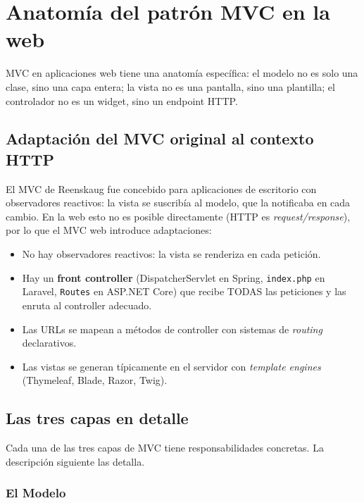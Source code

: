 \documentclass[11pt,a4paper,openany]{book}
\begin{document}
\section{Anatomía del patrón MVC en la web}

MVC en aplicaciones web tiene una anatomía específica: el
modelo no es solo una clase, sino una capa entera; la vista no es
una pantalla, sino una plantilla; el controlador no es un widget,
sino un endpoint HTTP.


\subsection{Adaptación del MVC original al contexto HTTP}

El MVC de Reenskaug fue concebido para aplicaciones de escritorio
con observadores reactivos: la vista se suscribía al modelo, que la
notificaba en cada cambio. En la web esto no es posible directamente
(HTTP es \emph{request/response}), por lo que el MVC web introduce
adaptaciones:

\begin{itemize}
\item No hay observadores reactivos: la vista se renderiza en cada
petición.
\item Hay un \textbf{front controller} (DispatcherServlet en Spring,
\texttt{index.php} en Laravel, \texttt{Routes} en ASP.NET Core) que
recibe TODAS las peticiones y las enruta al controller adecuado.
\item Las URLs se mapean a métodos de controller con sistemas de
\emph{routing} declarativos.
\item Las vistas se generan típicamente en el servidor con
\emph{template engines} (Thymeleaf, Blade, Razor, Twig).
\end{itemize}

\subsection{Las tres capas en detalle}

Cada una de las tres capas de MVC tiene responsabilidades
concretas. La descripción siguiente las detalla.


\subsubsection{El Modelo}
\end{document}
